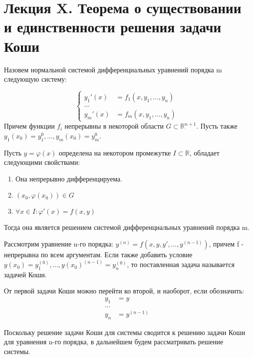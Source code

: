 \documentclass[document.tex]{subfiles}
\begin{document}
\section*{Лекция X. Теорема о существовании и единственности решения задачи Коши}
\begin{definition}
Назовем нормальной системой дифференциальных уравнений порядка m следующую систему:

$$\left\{
\begin{aligned}y_1'(x) &= f_1(x, y_1, \ldots, y_n)\\
\ldots \\
y_m'(x) &= f_m(x, y_1, \ldots, y_n)
\end{aligned}
\right.$$
Причем функции $f_i$ непрерывны в некоторой области $G \subset \mathbb{R}^{n+1}$. Пусть также $y_1(x_0) = y_1^0, \ldots, y_m(x_0) = y_m^0$.
\end{definition}

\begin{definition}
Пусть $y = \varphi(x)$ определена на некотором промежутке $I \subset \mathbb{R}$, обладает следующими свойствами:
\begin{enumerate}
\item Она непрерывно дифференцируема.
\item $(x_0, \varphi(x_0)) \in G$
\item $\forall x \in I: \varphi'(x) = f(x, y)$
\end{enumerate}
Тогда она является решением системой дифференциальных уравнений порядка m.
\end{definition}

\begin{Example}
Рассмотрим уравнение n-го порядка:
$y^{(n)} = f(x, y, y', \ldots, y^{(n-1)})$, причем f - непрерывна по всем аргументам.
Если также добавить условие $y(x_0) = y_1^{(0)}, \ldots, y(x_0)^{(n-1)} = y_n^{(0)}$, то поставленная задача называется задачей Коши.
\end{Example}

\begin{Remark}
От первой задачи Коши можно перейти ко второй, и наоборот, если обозначить:
$$\begin{aligned}y_1 &= y\\
...\\
y_n &= y^{(n-1)}
\end{aligned}$$
\end{Remark}

\begin{Remark}
Поскольку решение задачи Коши для системы сводится к решению задачи Коши для уравнения n-го порядка, в дальнейшем будем рассматривать решение системы.
\end{Remark}
\end{document}
